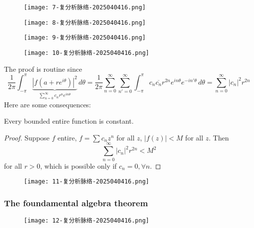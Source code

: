 \begin{figure}[H]
\centering
\texttt{[image: 7-复分析脉络-2025040416.png]}
\label{}
\end{figure}

\begin{figure}[H]
\centering
\texttt{[image: 8-复分析脉络-2025040416.png]}
\label{}
\end{figure}

\begin{figure}[H]
\centering
\texttt{[image: 9-复分析脉络-2025040416.png]}
\label{}
\end{figure}

\begin{figure}[H]
\centering
\texttt{[image: 10-复分析脉络-2025040416.png]}
\label{}
\end{figure}

The proof is routine since
\[
\frac{1}{2\pi}\int_{-\pi}^{\pi} \underbrace{ \left\lvert  f(a+re^{ i\theta })   \right\rvert ^2}_{ \sum_{n=0}^{\infty} c_nr^{n}e^{ in\theta } }  \, d\theta = \frac{1}{2\pi}\sum_{n=0}^{\infty} \sum_{n'=0}^{\infty}  \int_{-\pi}^{\pi} c_n \overline{c_n}r^{2n}e^{ in\theta }e^{ -in'\theta } \, d\theta =\sum_{n=0}^{\infty} \lvert c_n \rvert ^2 r^{2n}
\]
Here are some consequences:

\begin{theorem}
Every bounded entire function is constant.
\end{theorem}
\begin{proof}
Suppose $f$ entire, $f=\sum c_nz^{n}$ for all $z$, $\lvert f(z) \rvert<M$ for all $z$. Then
\[
\sum_{n=0}^{\infty} \lvert c_n \rvert ^2r^{2n}<M^2
\]
for all $r>0$, which is possible only if $c_n=0,\forall n$.
\end{proof}
\begin{figure}[H]
\centering
\texttt{[image: 11-复分析脉络-2025040416.png]}
\label{}
\end{figure}

\subsubsection{The foundamental algebra theorem}

\begin{figure}[H]
\centering
\texttt{[image: 12-复分析脉络-2025040416.png]}
\label{}
\end{figure}

